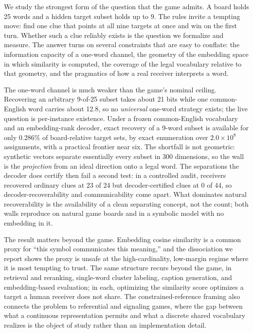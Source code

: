 \documentclass[11pt]{article}
\begin{document}
We study the strongest form of the question that the game admits. A board holds
25 words and a hidden target subset holds up to 9. The rules invite a tempting
move: find one clue that points at all nine targets at once and win on the first
turn. Whether such a clue reliably exists is the question we formalize and
measure. The answer turns on several constraints that are easy to conflate: the
information capacity of a one-word channel, the geometry of the embedding space
in which similarity is computed, the coverage of the legal vocabulary relative to
that geometry, and the pragmatics of how a real receiver interprets a word.

The one-word channel is much weaker than the game's nominal ceiling. Recovering
an arbitrary 9-of-25 subset takes about 21 bits while one common-English word
carries about 12.8, so no \emph{universal} one-word strategy exists; the live
question is per-instance existence. Under a frozen common-English vocabulary and
an embedding-rank decoder, exact recovery of a 9-word subset is available for
only $0.286\%$ of board-relative target sets, by exact enumeration over
$2.0 \times 10^{8}$ assignments, with a practical frontier near six. The
shortfall is not geometric: synthetic vectors separate essentially every subset
in 300 dimensions, so the wall is the \emph{projection} from an ideal direction
onto a legal word. The separations the decoder does certify then fail a second
test: in a controlled audit, receivers recovered ordinary clues at 23 of 24 but
decoder-certified clues at 0 of 44, so decoder-recoverability and communicability
come apart. What dominates natural recoverability is the availability of a clean
separating concept, not the count; both walls reproduce on natural game boards
and in a symbolic model with no embedding in it.

The result matters beyond the game. Embedding cosine similarity is a common proxy
for ``this symbol communicates this meaning,'' and the dissociation we report shows
the proxy is unsafe at the high-cardinality, low-margin regime where it is most
tempting to trust. The same structure recurs beyond the game, in retrieval and
reranking, single-word cluster labeling, caption generation, and embedding-based
evaluation; in each, optimizing the similarity score optimizes a target a human
receiver does not share. The constrained-reference framing also connects the problem to
referential and signaling games, where the gap between what a continuous
representation permits and what a discrete shared vocabulary realizes is the
object of study rather than an implementation detail.
\end{document}
